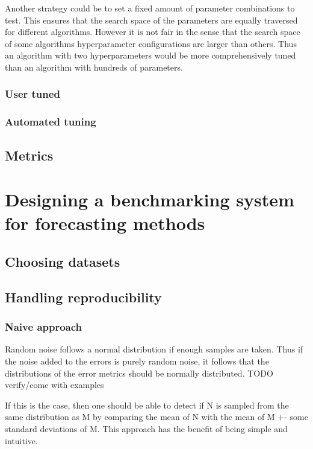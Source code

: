 Another strategy could be to set a fixed amount of parameter combinations to test. This ensures that the search space of the parameters are equally traversed for different algorithms. However it is not fair in the sense that the search space of some algorithms hyperparameter configurations are larger than others. Thus an algorithm with two hyperparameters would be more comprehensively tuned than an algorithm with hundreds of parameters.

\subsubsection{User tuned}
\subsubsection{Automated tuning}

\subsection{Metrics}

\section{Designing a benchmarking system for forecasting methods}

\subsection{Choosing datasets}
\subsection{Handling reproducibility}
\subsubsection{Naive approach}
Random noise follows a normal distribution if enough samples are taken. Thus if the noise added to the errors is purely random noise, it follows that the distributions of the error metrics should be normally distributed. TODO verify/come with examples

If this is the case, then one should be able to detect if N is sampled from the same distribution as M by comparing the mean of N with the mean of M +- some standard deviations of M. This approach has the benefit of being simple and intuitive.
